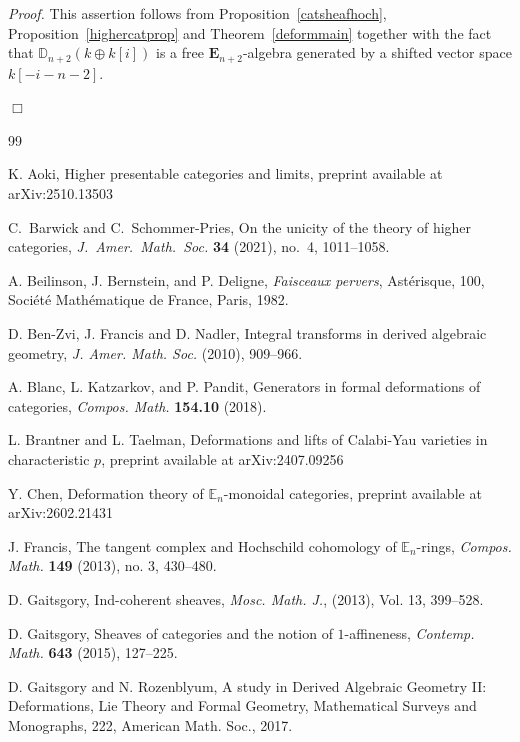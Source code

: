 \documentclass[leqno,12pt]{amsart}
\theoremstyle{plain}
\theoremstyle{definition}
\newcommand{\DD}{\mathbb{D}}
\newcommand{\Proof}{{\sl Proof.}\quad}
\newcommand{\QED}{{\unskip\nobreak\hfil\penalty50\quad\null\nobreak\hfil
{$\Box$}\parfillskip0pt\finalhyphendemerits0\par\medskip}}
\begin{document}
\Proof
This assertion follows from Proposition~\ref{catsheafhoch}, Proposition~\ref{highercatprop} and Theorem~\ref{deformmain}
together with the fact that $\DD_{n+2}(k\oplus k[i])$ is a free $\mathbf{E}_{n+2}$-algebra generated by a shifted vector space $k[-i-n-2]$.
\QED









\begin{thebibliography}{99}



K. Aoki,
Higher presentable categories and limits,
preprint available at arXiv:2510.13503

C.~Barwick and C.~Schommer-Pries,
On the unicity of the theory of higher categories,
\emph{J.\ Amer.\ Math.\ Soc.} \textbf{34} (2021), no.~4, 1011--1058.

A. Beilinson, J. Bernstein, and P. Deligne,
\emph{Faisceaux pervers},
Ast\'erisque, 100, Soci\'et\'e Math\'ematique de France, Paris, 1982.

D. Ben-Zvi, J. Francis and D. Nadler,
Integral transforms in derived algebraic geometry,
\emph{J. Amer. Math. Soc.} (2010), 909--966.

A. Blanc, L. Katzarkov, and P. Pandit,
Generators in formal deformations of categories,
\emph{Compos. Math.} \textbf{154.10} (2018).

L. Brantner and L. Taelman,
Deformations and lifts of Calabi-Yau varieties in characteristic $p$,
preprint available at arXiv:2407.09256

Y. Chen,
Deformation theory of $\mathbb{E}_n$-monoidal categories,
preprint available at arXiv:2602.21431

J. Francis,
The tangent complex and Hochschild cohomology of $\mathbb{E}_n$-rings,
\emph{Compos. Math.} \textbf{149} (2013), no. 3, 430--480.

D. Gaitsgory,
Ind-coherent sheaves,
\emph{Mosc. Math. J.}, (2013), Vol. 13, 399--528.

D. Gaitsgory,
Sheaves of categories and the notion of $1$-affineness,
\emph{Contemp. Math.} \textbf{643} (2015), 127--225.

D. Gaitsgory and N. Rozenblyum,
A study in Derived Algebraic Geometry II: Deformations, Lie Theory and Formal Geometry,
Mathematical Surveys and Monographs, 222, American Math. Soc., 2017.


\end{thebibliography}
\end{document}
